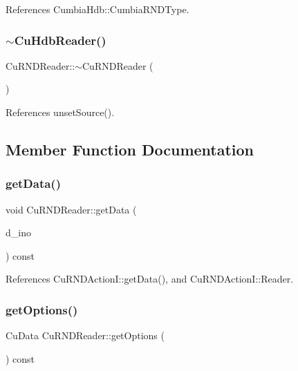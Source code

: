 References Cumbia\+Hdb\+::\+Cumbia\+R\+N\+D\+Type.

\mbox{\label{classCuHdbReader_aff0d4817a6b8ad6c9ca6c2dd86af0a2c}} 
\subsubsection{$\sim$CuHdbReader()}
{\footnotesize\ttfamily Cu\+R\+N\+D\+Reader\+::$\sim$\+Cu\+R\+N\+D\+Reader (\begin{DoxyParamCaption}{ }\end{DoxyParamCaption})\hspace{0.3cm}{\ttfamily [virtual]}}



References unset\+Source().



\subsection{Member Function Documentation}
\mbox{\label{classCuHdbReader_a1ee9932164331d85a3dfcd07bcdfcf78}} 
\subsubsection{getData()}
{\footnotesize\ttfamily void Cu\+R\+N\+D\+Reader\+::get\+Data (\begin{DoxyParamCaption}\item[{Cu\+Data \&}]{d\+\_\+ino }\end{DoxyParamCaption}) const\hspace{0.3cm}{\ttfamily [virtual]}}



References Cu\+R\+N\+D\+Action\+I\+::get\+Data(), and Cu\+R\+N\+D\+Action\+I\+::\+Reader.

\mbox{\label{classCuHdbReader_a9cf40ba86e8a16d13dd496f8575ff567}} 
\subsubsection{getOptions()}
{\footnotesize\ttfamily Cu\+Data Cu\+R\+N\+D\+Reader\+::get\+Options (\begin{DoxyParamCaption}{ }\end{DoxyParamCaption}) const}

